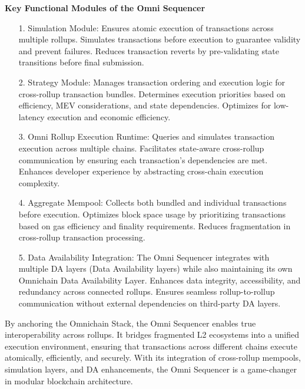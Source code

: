 \textbf{Key Functional Modules of the Omni Sequencer}

\begin{itemize}
    \item[1.] Simulation Module: Ensures atomic execution of transactions across multiple rollups. Simulates transactions before execution to guarantee validity and prevent failures. Reduces transaction reverts by pre-validating state transitions before final submission.

    \item[2.] Strategy Module: Manages transaction ordering and execution logic for cross-rollup transaction bundles. Determines execution priorities based on efficiency, MEV considerations, and state dependencies. Optimizes for low-latency execution and economic efficiency.

    \item[3.] Omni Rollup Execution Runtime: Queries and simulates transaction execution across multiple chains. Facilitates state-aware cross-rollup communication by ensuring each transaction’s dependencies are met. Enhances developer experience by abstracting cross-chain execution complexity.

    \item[4.] Aggregate Mempool: Collects both bundled and individual transactions before execution. Optimizes block space usage by prioritizing transactions based on gas efficiency and finality requirements. Reduces fragmentation in cross-rollup transaction processing.
    
    \item[5.] Data Availability Integration: The Omni Sequencer integrates with multiple DA layers (Data Availability layers) while also maintaining its own Omnichain Data Availability Layer. Enhances data integrity, accessibility, and redundancy across connected rollups. Ensures seamless rollup-to-rollup communication without external dependencies on third-party DA layers.

\end{itemize}
By anchoring the Omnichain Stack, the Omni Sequencer enables true interoperability across rollups. It bridges fragmented L2 ecosystems into a unified execution environment, ensuring that transactions across different chains execute atomically, efficiently, and securely. With its integration of cross-rollup mempools, simulation layers, and DA enhancements, the Omni Sequencer is a game-changer in modular blockchain architecture.

